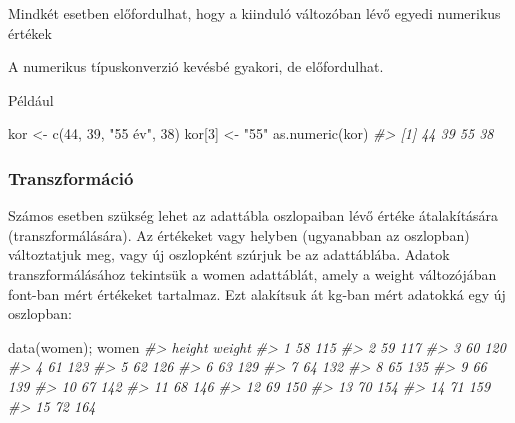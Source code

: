 \documentclass[
]{book}
\newenvironment{Shaded}{\begin{snugshade}}{\end{snugshade}}
\newcommand{\CommentTok}[1]{\textcolor[rgb]{0.56,0.35,0.01}{\textit{#1}}}
\newcommand{\DecValTok}[1]{\textcolor[rgb]{0.00,0.00,0.81}{#1}}
\newcommand{\FunctionTok}[1]{\textcolor[rgb]{0.00,0.00,0.00}{#1}}
\newcommand{\NormalTok}[1]{#1}
\newcommand{\OtherTok}[1]{\textcolor[rgb]{0.56,0.35,0.01}{#1}}
\newcommand{\StringTok}[1]{\textcolor[rgb]{0.31,0.60,0.02}{#1}}
\begin{document}
Mindkét esetben előfordulhat, hogy a kiinduló változóban lévő egyedi numerikus értékek

A numerikus típuskonverzió kevésbé gyakori, de előfordulhat.

Például

\begin{Shaded}
\begin{Highlighting}[]
\NormalTok{kor }\OtherTok{\textless{}{-}} \FunctionTok{c}\NormalTok{(}\DecValTok{44}\NormalTok{, }\DecValTok{39}\NormalTok{, }\StringTok{"55 év"}\NormalTok{, }\DecValTok{38}\NormalTok{)}
\NormalTok{kor[}\DecValTok{3}\NormalTok{] }\OtherTok{\textless{}{-}} \StringTok{"55"}
\FunctionTok{as.numeric}\NormalTok{(kor)}
\CommentTok{\#\textgreater{} [1] 44 39 55 38}
\end{Highlighting}
\end{Shaded}

\hypertarget{transzformuxe1ciuxf3}{%
\subsubsection{Transzformáció}\label{transzformuxe1ciuxf3}}

Számos esetben szükség lehet az adattábla oszlopaiban lévő értéke átalakítására (transzformálására). Az értékeket vagy helyben (ugyanabban az oszlopban) változtatjuk meg, vagy új oszlopként szúrjuk be az adattáblába.
Adatok transzformálásához tekintsük a women adattáblát, amely a weight változójában font-ban mért értékeket tartalmaz. Ezt alakítsuk át kg-ban mért adatokká egy új oszlopban:

\begin{Shaded}
\begin{Highlighting}[]
\FunctionTok{data}\NormalTok{(women); women}
\CommentTok{\#\textgreater{}    height weight}
\CommentTok{\#\textgreater{} 1      58    115}
\CommentTok{\#\textgreater{} 2      59    117}
\CommentTok{\#\textgreater{} 3      60    120}
\CommentTok{\#\textgreater{} 4      61    123}
\CommentTok{\#\textgreater{} 5      62    126}
\CommentTok{\#\textgreater{} 6      63    129}
\CommentTok{\#\textgreater{} 7      64    132}
\CommentTok{\#\textgreater{} 8      65    135}
\CommentTok{\#\textgreater{} 9      66    139}
\CommentTok{\#\textgreater{} 10     67    142}
\CommentTok{\#\textgreater{} 11     68    146}
\CommentTok{\#\textgreater{} 12     69    150}
\CommentTok{\#\textgreater{} 13     70    154}
\CommentTok{\#\textgreater{} 14     71    159}
\CommentTok{\#\textgreater{} 15     72    164}
\end{Highlighting}
\end{Shaded}
\end{document}
